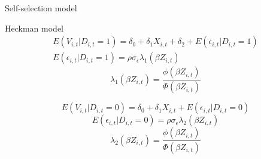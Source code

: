 \documentclass[aspectratio=169,xcolor=dvipsnames]{beamer}
\begin{document}
\begin{frame}{Self-selection model}
    \begin{block}{Heckman model}
        \begin{equation}
            \begin{aligned}
                E(V_{i,t} | D_{i,t} = 1) = \delta_0 + \delta_1 X_{i ,t} + \delta_2 + E(\epsilon_{i,t} | D_{i,t} = 1) \\
                E(\epsilon_{i,t} | D_{i,t} = 1) = \rho \sigma_{\epsilon} \lambda_1 (\beta Z_{i,t})
            \end{aligned}
        \end{equation}
        \begin{equation}
            \lambda_1 (\beta Z_{i,t}) = \frac{\phi(\beta Z_{i,t})}{\Phi(\beta Z_{i,t})}
        \end{equation}

        \begin{equation}
            E(V_{i,t} | D_{i,t} = 0) = \delta_0 + \delta_1 X_{i ,t} + E(\epsilon_{i,t} | D_{i,t} = 0)
        \end{equation}
        \begin{equation}
            E(\epsilon_{i,t} | D_{i,t} = 0) = \rho \sigma_{\epsilon} \lambda_2 (\beta Z_{i,t})
        \end{equation}
        \begin{equation}
            \lambda_2 (\beta Z_{i,t}) = \frac{\phi(\beta Z_{i,t})}{\Phi(\beta Z_{i,t})}
        \end{equation}
    \end{block}
\end{frame}
\end{document}
